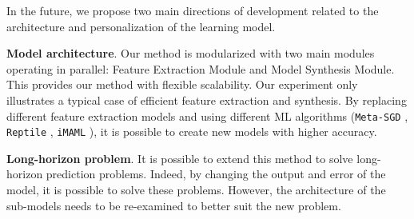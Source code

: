 \documentclass[aps,prb,groupedaddress,twocolumn,showpacs,dvipdfmx,superscriptaddress,pdftex]{revtex4-2}
\begin{document}
\vspace{2mm}


In the future, we propose two main directions of development related to the architecture and personalization of the learning model.

\vspace{2mm}


\textbf{Model architecture}. Our method is modularized with two main modules operating in parallel: Feature Extraction Module and Model Synthesis Module. This provides our method with flexible scalability. Our experiment only illustrates a typical case of efficient feature extraction and synthesis. By replacing different feature extraction models and using different ML algorithms (\verb|Meta-SGD| \cite{li2017meta}, \verb|Reptile| \cite{nichol2018first}, \verb|iMAML| \cite{rajeswaran2019meta}), it is possible to create new models with higher accuracy.

\vspace{2mm}


\textbf{Long-horizon problem}. It is possible to extend this method to solve long-horizon prediction problems. Indeed, by changing the output and error of the model, it is possible to solve these problems. However, the architecture of the sub-models needs to be re-examined to better suit the new problem.

\end{document}
